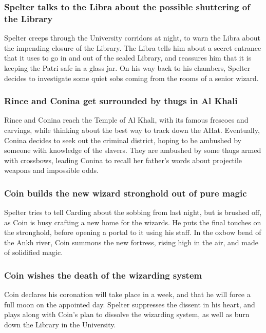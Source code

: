 \subsubsection{\Gls{Spelter} talks to the \Gls{Libra} about the possible shuttering of the Library}
\Gls{Spelter} creeps through the University corridors at night, to warn the \Gls{Libra} about the
impending closure of the Library. The \Gls{Libra} tells him about a secret entrance that it uses to
go in and out of the sealed Library, and reassures him that it is keeping the \Gls{Patri} safe in a
glass jar. On his way back to his chambers, \Gls{Spelter} decides to investigate some quiet sobs
coming from the rooms of a senior wizard.

\subsubsection{\Gls{Rince} and \Gls{Conina} get surrounded by thugs in Al Khali}
\Gls{Rince} and \Gls{Conina} reach the Temple of Al Khali, with its famous frescoes and carvings,
while thinking about the best way to track down the \Gls{AHat}. Eventually, \Gls{Conina} decides to
seek out the criminal district, hoping to be ambushed by someone with knowledge of the slavers.
They are ambushed by some thugs armed with crossbows, leading \Gls{Conina} to recall her father's
words about projectile weapons and impossible odds.

\subsubsection{\Gls{Coin} builds the new wizard stronghold out of pure magic}
\Gls{Spelter} tries to tell \Gls{Carding} about the sobbing from last night, but is brushed off,
as \Gls{Coin} is busy crafting a new home for the wizards. He puts the final touches on the
stronghold, before opening a portal to it using his staff. In the oxbow bend of the Ankh river,
\Gls{Coin} summons the new fortress, rising high in the air, and made of solidified magic.

\subsubsection{\Gls{Coin} wishes the death of the wizarding system}
\Gls{Coin} declares his coronation will take place in a week, and that he will force a full moon
on the appointed day. \Gls{Spelter} suppresses the dissent in his heart, and plays along with
\Gls{Coin}'s plan to dissolve the wizarding system, as well as burn down the Library in the
University.

